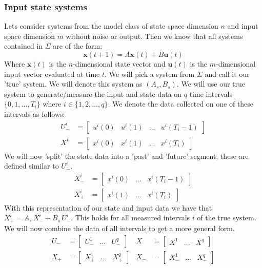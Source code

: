 \subsubsection*{Input state systems}
Lets consider systems from the model class of state space dimension $n$ and input space dimension $m$ without noise or output. Then we know that all systems contained in $\Sigma$ are of the form:
\begin{equation}
	\label{isSystem}
	\mathbf{x}(t+1) = A \mathbf{x}(t) + B \mathbf{u}(t)
\end{equation}
Where $\mathbf{x}(t)$ is the $n$-dimensional state vector and $\mathbf{u}(t)$ is the $m$-dimensional input vector evaluated at time $t$. We will pick a system from $\Sigma$ and call it our 'true' system. We will denote this system as $(A_s , B_s)$. 
We will use our true system to generate/measure the input and state data on $q$ time intervals $\{0,1,\dots,T_i\}$ where $i \in \{1,2,\dots,q\}$. We denote the data collected on one of these intervals as follows:
\begin{align*}
	U^{i}_{-} &= \left[ \begin{array}{cccc} u^{i}(0) & u^{i}(1) & \dots & u^{i}(T_i - 1) \end{array} \right] \\
	X^{i}     &= \left[ \begin{array}{cccc} x^{i}(0) & x^{i}(1) & \dots & x^{i}(T_i) \end{array} \right]
\end{align*}
We will now 'split' the state data into a 'past' and 'future' segment, these are defined similar to $U^i_-$.
\begin{align*}
	X^{i}_{-} &= \left[ \begin{array}{ccc} x^{i}(0) & \dots & x^{i}(T_i - 1) \end{array} \right] \\
	X^{i}_{+} &= \left[ \begin{array}{ccc} x^{i}(1) & \dots & x^{i}(T_i) \end{array} \right]
\end{align*}
With this representation of our state and input data we have that $X^{i}_{+} = A_s \, X^{i}_{-} + B_s \, U^{i}_{-}$. This holds for all measured intervals $i$ of the true system. We will now combine the data of all intervals to get a more general form.
\begin{align*}
	U_{-} &= \left[ \begin{array}{ccc} U^{1}_{-} & \dots & U^{q}_{-} \end{array} \right] &
	X     &= \left[ \begin{array}{ccc} X^{1} & \dots & X^{q} \end{array} \right] \\
	X_{+} &= \left[ \begin{array}{ccc} X^{1}_{+} & \dots & X^{q}_{+} \end{array} \right] &
	X_{-} &= \left[ \begin{array}{ccc} X^{1}_{-} & \dots & X^{q}_{-} \end{array} \right]
\end{align*}
